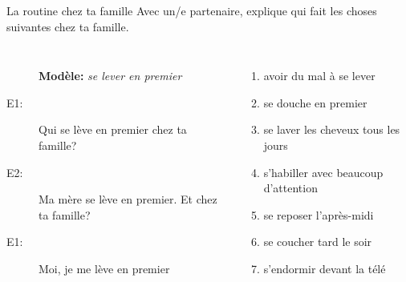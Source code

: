 \documentclass{beamer}
\begin{document}
  \begin{frame}{La routine chez ta famille}
    Avec un/e partenaire, explique qui fait les choses suivantes chez ta famille. \\
    \begin{columns}[t]
        \begin{description}
          \item[] \textbf{Modèle:} \emph{se lever en premier}
          \item[E1:] Qui se lève en premier chez ta famille?
          \item[] 
          \item[E2:] Ma mère se lève en premier. Et chez ta famille?
          \item[] 
          \item[E1:] Moi, je me lève en premier
          \item[] 
        \end{description}
        \begin{enumerate}
          \item avoir du mal  à se lever
          \item se douche en premier
          \item se laver les cheveux tous les jours
          \item s'habiller avec beaucoup d'attention
          \item se reposer l'après-midi
          \item se coucher tard le soir
          \item s'endormir devant la télé
        \end{enumerate}
    \end{columns}
  \end{frame}
\end{document}
